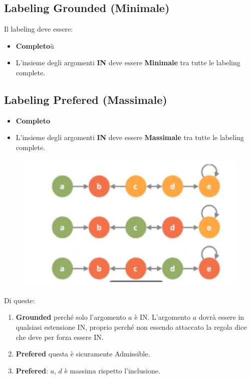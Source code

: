    \subsection{Labeling Grounded (Minimale)}
    Il labeling deve essere:
    \begin{itemize}
        \item \textbf{Completo}ù
        \item L'insieme degli argomenti \textbf{IN} deve essere \textbf{Minimale} tra tutte le labeling complete.
    \end{itemize}
    \subsection{Labeling Prefered (Massimale)}
    \begin{itemize}
        \item \textbf{Completo}
        \item L'insieme degli argomenti \textbf{IN} deve essere \textbf{Massimale} tra tutte le labeling complete.
    \end{itemize}
    \begin{figure}[H]
        \centering
        \includegraphics[width=12cm, keepaspectratio]{img/Cap7/GR.png}
    \end{figure}
    Di queste:
    \begin{enumerate}
        \item \textbf{Grounded} perché solo l'argomento $a$ è IN. L'argomento $a$ dovrà essere in qualsiasi estensione IN, proprio perché non essendo attaccato la regola dice che deve per forza essere IN.
        \item \textbf{Prefered} questa è sicuramente Admissible.
        \item \textbf{Prefered}: $a$, $d$ è massima rispetto l'inclusione.
    \end{enumerate}


